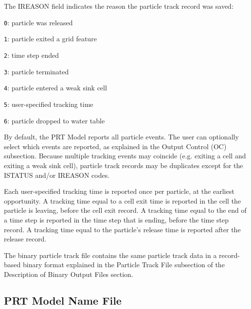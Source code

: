 The IREASON field indicates the reason the particle track record was saved:

\begin{description} \itemsep0pt \parskip0pt 
\item \texttt{0}: particle was released
\item \texttt{1}: particle exited a grid feature
\item \texttt{2}: time step ended
\item \texttt{3}: particle terminated
\item \texttt{4}: particle entered a weak sink cell
\item \texttt{5}: user-specified tracking time
\item \texttt{6}: particle dropped to water table
\end{description}

By default, the PRT Model reports all particle events. The user can optionally select which events are reported, as explained in the Output Control (OC) subsection. Because multiple tracking events may coincide (e.g. exiting a cell and exiting a weak sink cell), particle track records may be duplicates except for the ISTATUS and/or IREASON codes.

Each user-specified tracking time is reported once per particle, at the earliest opportunity. A tracking time equal to a cell exit time is reported in the cell the particle is leaving, before the cell exit record. A tracking time equal to the end of a time step is reported in the time step that is ending, before the time step record. A tracking time equal to the particle's release time is reported after the release record.

The binary particle track file contains the same particle track data in a record-based binary format explained in the Particle Track File subsection of the Description of Binary Output Files section.



\newpage
\subsection{PRT Model Name File}


%

%

